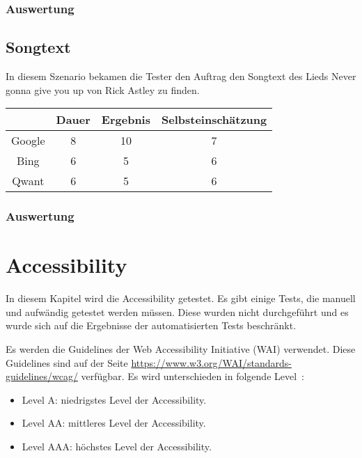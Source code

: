 \subsubsection*{Auswertung}

\subsection{Songtext}\label{subsec:szenario3}
In diesem Szenario bekamen die Tester den Auftrag den Songtext des Lieds Never gonna give you up von Rick Astley zu finden.

\begin{tabular}{|c|c|c|c|}
    \hline
    & Dauer & Ergebnis & Selbsteinschätzung \\
    \hline
    Google & 8     & 10       & 7                  \\
    \hline
    Bing   & 6     & 5        & 6                  \\
    \hline
    Qwant  & 6     & 5        & 6                  \\
    \hline
\end{tabular}

\subsubsection*{Auswertung}

\section{Accessibility}\label{sec:accessibility}
In diesem Kapitel wird die Accessibility getestet.
Es gibt einige Tests, die manuell und aufwändig getestet werden müssen.
Diese wurden nicht durchgeführt und es wurde sich auf die Ergebnisse der automatisierten Tests beschränkt.

Es werden die Guidelines der Web Accessibility Initiative (WAI) verwendet.
Diese Guidelines sind auf der Seite \url{https://www.w3.org/WAI/standards-guidelines/wcag/} verfügbar.\newline
Es wird unterschieden in folgende Level~\cite{WCAG21}:
\begin{itemize}
    \item Level A: niedrigstes Level der Accessibility.
    \item Level AA: mittleres Level der Accessibility.
    \item Level AAA: höchstes Level der Accessibility.
\end{itemize}

